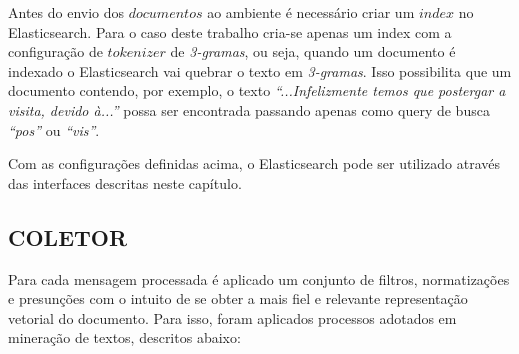 \documentclass[12pt,a4paper]{article}
\begin{document}
Antes do envio dos $documentos$ ao ambiente é necessário criar um $index$ no Elasticsearch. Para o caso deste trabalho cria-se apenas um index com a configuração
de $tokenizer$ de \textit{3-gramas}, ou seja, quando um documento é indexado o Elasticsearch vai quebrar o texto em \textit{3-gramas}. Isso
possibilita que um documento contendo, por exemplo, o texto \textit{``...Infelizmente temos que postergar a visita, devido à...''} possa ser encontrada passando
apenas como query de busca \textit{``pos''} ou \textit{``vis''}.

Com as configurações definidas acima, o Elasticsearch pode ser utilizado através das interfaces descritas neste capítulo.


\subsection{COLETOR} \label{sec:coletor}
Para cada mensagem processada é aplicado um conjunto de filtros, normatizações e presunções com o intuito de se obter a mais fiel e relevante representação vetorial do documento.
 Para isso, foram aplicados processos adotados em mineração de textos, descritos abaixo:
\end{document}
